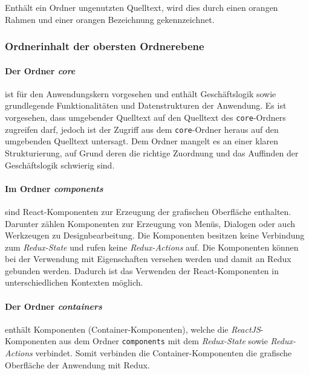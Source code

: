 Enthält ein Ordner ungenutzten Quelltext, wird dies durch einen orangen Rahmen und einer orangen Bezeichnung gekennzeichnet.

\subsubsection{Ordnerinhalt der obersten Ordnerebene}
\paragraph{Der Ordner \emph{core}} ist für den Anwendungskern vorgesehen und enthält Geschäftslogik sowie grundlegende Funktionalitäten und Datenstrukturen der Anwendung. 
Es ist vorgesehen, dass umgebender Quelltext auf den Quelltext des \lstinline|core|-Ordners zugreifen darf, jedoch ist der Zugriff aus dem \lstinline|core|-Ordner heraus auf den umgebenden Quelltext untersagt. Dem Ordner mangelt es an einer klaren Strukturierung, auf Grund deren die richtige Zuordnung und das Auffinden der Geschäftslogik schwierig sind. 

\paragraph{Im Ordner \emph{components}} sind React-Komponenten zur Erzeugung der grafischen Oberfläche enthalten. Darunter zählen Komponenten zur Erzeugung von Menüs, Dialogen oder auch Werkzeugen zu Designbearbeitung. Die Komponenten besitzen keine Verbindung zum \emph{Redux-State} und rufen keine \emph{Redux-Actions} auf. Die Komponenten können bei der Verwendung mit Eigenschaften versehen werden und damit an Redux gebunden werden. Dadurch ist das Verwenden der React-Komponenten in unterschiedlichen Kontexten möglich.

\paragraph{Der Ordner \emph{containers}} enthält Komponenten (Container-Komponenten), welche die \emph{ReactJS}-Komponenten aus dem Ordner \lstinline|components| mit dem \emph{Redux-State} sowie \emph{Redux-Actions} verbindet. Somit verbinden die Container-Komponenten die grafische Oberfläche der Anwendung mit Redux.



